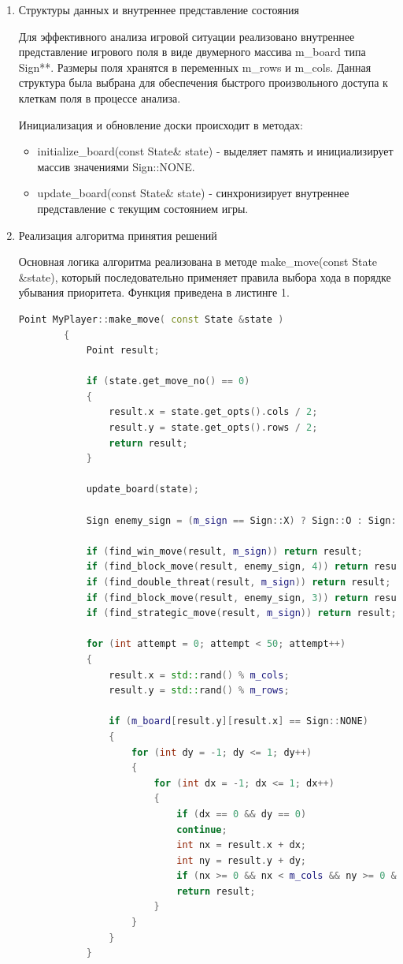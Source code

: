 \documentclass[a4paper]{article}
\begin{document}
\begin{enumerate}
	\item Структуры данных и внутреннее представление состояния
	
	Для эффективного анализа игровой ситуации реализовано внутреннее представление игрового поля в виде двумерного массива m\_board типа Sign**. Размеры поля хранятся в переменных m\_rows и m\_cols. Данная структура была выбрана для обеспечения быстрого произвольного доступа к клеткам поля в процессе анализа.
	
	Инициализация и обновление доски происходит в методах:
	\begin{itemize}
		\item initialize\_board(const State\& state) - выделяет память и инициализирует массив значениями Sign::NONE.
		
		\item update\_board(const State\& state) - синхронизирует внутреннее представление с текущим состоянием игры.
	\end{itemize}
	
	\item Реализация алгоритма принятия решений
	
	Основная логика алгоритма реализована в методе make\_move(const State \&state), который последовательно применяет правила выбора хода в порядке убывания приоритета.  Функция приведена в листинге 1.
	
	\begin{lstlisting}[language=C++, caption={Функция выбора хода}]
		Point MyPlayer::make_move( const State &state )
		{
			Point result;
			
			if (state.get_move_no() == 0)
			{
				result.x = state.get_opts().cols / 2;
				result.y = state.get_opts().rows / 2;
				return result;
			}
			
			update_board(state);
			
			Sign enemy_sign = (m_sign == Sign::X) ? Sign::O : Sign::X;
			
			if (find_win_move(result, m_sign)) return result;           
			if (find_block_move(result, enemy_sign, 4)) return result;  
			if (find_double_threat(result, m_sign)) return result;      
			if (find_block_move(result, enemy_sign, 3)) return result;  
			if (find_strategic_move(result, m_sign)) return result;     
			
			for (int attempt = 0; attempt < 50; attempt++)
			{
				result.x = std::rand() % m_cols;
				result.y = std::rand() % m_rows;
				
				if (m_board[result.y][result.x] == Sign::NONE)
				{
					for (int dy = -1; dy <= 1; dy++)
					{
						for (int dx = -1; dx <= 1; dx++)
						{
							if (dx == 0 && dy == 0)
							continue;
							int nx = result.x + dx;
							int ny = result.y + dy;
							if (nx >= 0 && nx < m_cols && ny >= 0 && ny < m_rows && m_board[ny][nx] != Sign::NONE)
							return result;
						}
					}
				}
			}
			

\end{lstlisting}
\end{enumerate}
\end{document}

